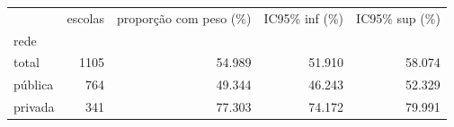 \begin{tabular}{lrrrr}
\toprule
 & escolas & proporção com peso (\%) & IC95\% inf (\%) & IC95\% sup (\%) \\
rede &  &  &  &  \\
\midrule
total & 1105 & 54.989 & 51.910 & 58.074 \\
pública & 764 & 49.344 & 46.243 & 52.329 \\
privada & 341 & 77.303 & 74.172 & 79.991 \\
\bottomrule
\end{tabular}
